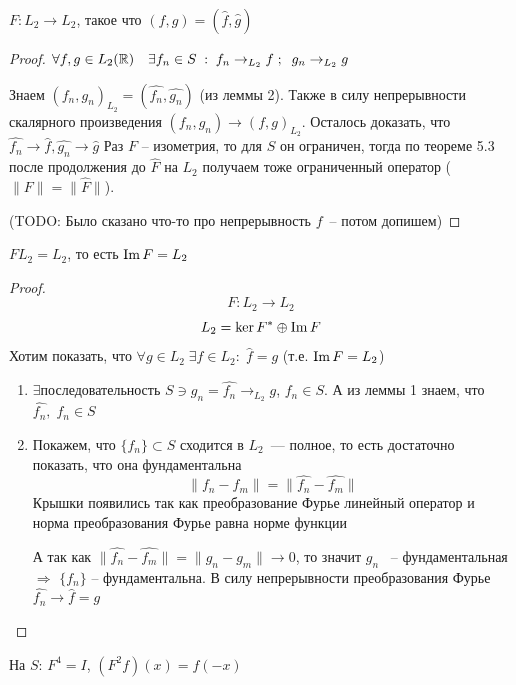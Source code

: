 \begin{theorem}[1]
    $F: L_2 \to L_2$, такое что $(f, g)=(\widehat{f}, \widehat{g})$
\end{theorem}

\begin{proof}
    $\forall f,g \in L_2(\mathbb{R}) \quad \exists f_n \in S \; : \; f_n \to_{L_2} f \;;\;\; g_n \to_{L_2} g$

    Знаем $(f_n, g_n)_{L_2}=(\widehat{f_n}, \widehat{g_n})$ (из леммы 2). Также в силу непрерывности скалярного произведения $(f_n, g_n) \to (f,g)_{L_2}$. Осталось доказать, что $\widehat{f_n} \to \widehat{f}, \widehat{g_n} \to \widehat{g}$
    Раз $F$ -- изометрия, то для $S$ он ограничен, тогда по теореме 5.3 после продолжения до $\widehat{F}$ на $L_2$ получаем тоже ограниченный оператор ($\| F\| = \| \widehat{F}\|$).

    (TODO: Было сказано что-то про непрерывность $f$~-- потом допишем)
\end{proof}

\begin{theorem}[2]
    $FL_2 = L_2$, то есть $\operatorname{Im} F = L_2$
\end{theorem}

\begin{proof}
    \[ F:  L_2 \to L_2 \]
    \[ L_2 = \ker F^* \oplus \operatorname{Im} F \]
    Хотим показать, что $\forall g \in L_2 \; \exists f \in L_2: \; \widehat{f}=g$ (т.е. $\operatorname{Im} F = L_2$)
    \begin{enumerate}
        \item $\exists$последовательность $S \ni g_n=\widehat{f_n} \to_{L_2} g$, $f_n \in S$. А из леммы 1 знаем, что $\widehat{f_n}, \; f_n \in S$
        \item Покажем, что $\{f_n\} \subset S$ сходится в $L_2$~--- полное, то есть достаточно показать, что она фундаментальна
        \[ \| f_n - f_m \| = \| \widehat{f_n} - \widehat{f_m} \|\]
        Крышки появились так как преобразование Фурье линейный оператор и норма преобразования Фурье равна норме функции
        
        А так как $ \| \widehat{f_n} - \widehat{f_m} \| = \|g_n - g_m\| \to 0$, то значит $g_n$ ~-- фундаментальная $\Rightarrow$ $\{f_n\}$ -- фундаментальна.
        В силу непрерывности преобразования Фурье $\widehat{f_n} \to \widehat{f} = g$
    \end{enumerate}
\end{proof}

\begin{note}
    На $S$: $F^4=I$, \; $(F^2 f)(x)=f(-x)$
\end{note}

